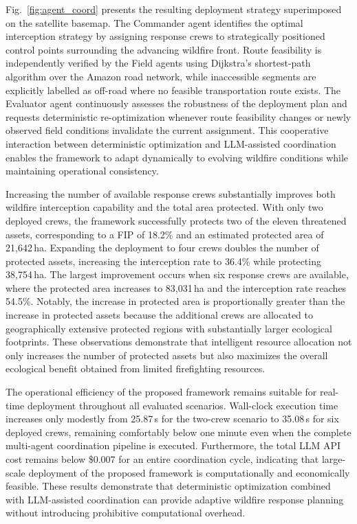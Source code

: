 \documentclass{ieeeaccess}
\begin{document}
Fig.~\ref{fig:agent_coord} presents the resulting deployment strategy superimposed on the satellite basemap. The Commander agent identifies the optimal interception strategy by assigning response crews to strategically positioned control points surrounding the advancing wildfire front. Route feasibility is independently verified by the Field agents using Dijkstra's shortest-path algorithm over the Amazon road network, while inaccessible segments are explicitly labelled as off-road where no feasible transportation route exists. The Evaluator agent continuously assesses the robustness of the deployment plan and requests deterministic re-optimization whenever route feasibility changes or newly observed field conditions invalidate the current assignment. This cooperative interaction between deterministic optimization and LLM-assisted coordination enables the framework to adapt dynamically to evolving wildfire conditions while maintaining operational consistency.

Increasing the number of available response crews substantially improves both wildfire interception capability and the total area protected. With only two deployed crews, the framework successfully protects two of the eleven threatened assets, corresponding to a FIP of 18.2\% and an estimated protected area of 21,642\,ha. Expanding the deployment to four crews doubles the number of protected assets, increasing the interception rate to 36.4\% while protecting 38,754\,ha. The largest improvement occurs when six response crews are available, where the protected area increases to 83,031\,ha and the interception rate reaches 54.5\%. Notably, the increase in protected area is proportionally greater than the increase in protected assets because the additional crews are allocated to geographically extensive protected regions with substantially larger ecological footprints. These observations demonstrate that intelligent resource allocation not only increases the number of protected assets but also maximizes the overall ecological benefit obtained from limited firefighting resources.

The operational efficiency of the proposed framework remains suitable for real-time deployment throughout all evaluated scenarios. Wall-clock execution time increases only modestly from 25.87\,s for the two-crew scenario to 35.08\,s for six deployed crews, remaining comfortably below one minute even when the complete multi-agent coordination pipeline is executed. Furthermore, the total LLM API cost remains below \$0.007 for an entire coordination cycle, indicating that large-scale deployment of the proposed framework is computationally and economically feasible. These results demonstrate that deterministic optimization combined with LLM-assisted coordination can provide adaptive wildfire response planning without introducing prohibitive computational overhead.
\end{document}
